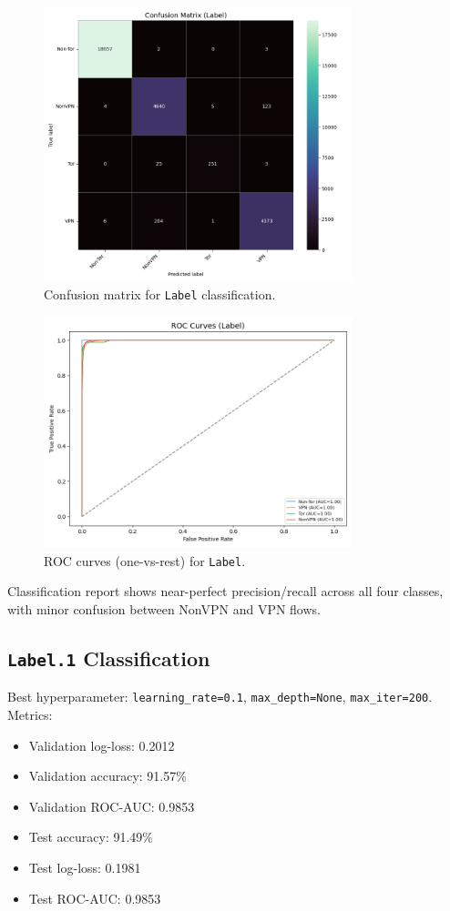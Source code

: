 \documentclass[12pt]{article}
\begin{document}
\begin{figure}[H]
  \centering
  \includegraphics[width=0.8\textwidth]{images/cm_Label.png}
  \caption{Confusion matrix for \texttt{Label} classification.}
  \label{fig:cm_label}
\end{figure}

\begin{figure}[H]
  \centering
  \includegraphics[width=0.8\textwidth]{images/roc_Label.png}
  \caption{ROC curves (one-vs-rest) for \texttt{Label}.}
  \label{fig:roc_label}
\end{figure}

Classification report shows near-perfect precision/recall across all four classes, with minor confusion between NonVPN and VPN flows.

\subsection{\texttt{Label.1} Classification}
Best hyperparameter: \texttt{learning\_rate=0.1}, \texttt{max\_depth=None}, \texttt{max\_iter=200}. Metrics:
\begin{itemize}
  \item Validation log-loss: 0.2012
  \item Validation accuracy: 91.57\%
  \item Validation ROC-AUC: 0.9853
  \item Test accuracy: 91.49\%
  \item Test log-loss: 0.1981
  \item Test ROC-AUC: 0.9853
\end{itemize}
\end{document}
